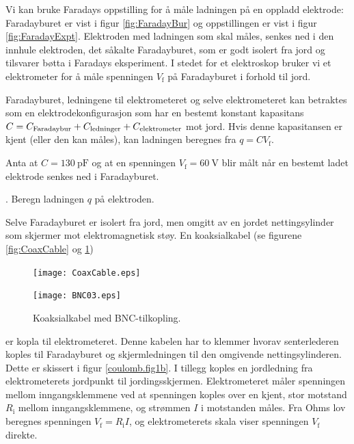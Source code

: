 \documentclass[../Elmag-labhefte-2020.tex]{subfiles}
\begin{document}
Vi kan bruke Faradays oppstilling for å måle ladningen på en oppladd elektrode: Faradayburet er vist i figur \ref{fig:FaradayBur} og oppstillingen er vist i figur \ref{fig:FaradayExpt}.  Elektroden med ladningen som skal måles, senkes ned i den innhule elektroden, det såkalte Faradayburet, som er godt isolert fra jord og tilsvarer bøtta i Faradays eksperiment. I stedet for et elektroskop bruker vi et elektrometer for å måle spenningen $V_\text{f}$ på Faradayburet i forhold til jord.  


Faradayburet, ledningene til elektrometeret og selve elektrometeret kan betraktes som en elektrodekonfigurasjon som har en bestemt konstant kapasitans $C = C_\text{Faradaybur} + C_{\rm ledninger} + C_\text{elektrometer}$ mot jord.  Hvis denne kapasitansen er kjent (eller den kan måles), kan ladningen beregnes fra $q = C V_\text{f}$.

Anta at $C = \SI{130}{\pico\farad}$ og at en spenningen $V_\text{f} = \SI{60}{\volt}$ blir målt når en bestemt ladet elektrode senkes ned i Faradayburet.

{.  Beregn ladningen $q$ på elektroden.}

Selve Faradayburet er isolert fra jord, men omgitt av en jordet nettingsylinder som skjermer mot elektromagnetisk støy. En koaksialkabel (se figurene \ref{fig:CoaxCable} og \ref{fig:BNC03}) 

\begin{figure}[!h]
    \begin{minipage}[b]{0.5\linewidth}
        \centering
        \texttt{[image: CoaxCable.eps]}
        \caption{%
            Tverrsnitt av en koaksialkabel.
        }
        \label{fig:CoaxCable}
    \end{minipage}
    \hspace{0.15cm}
    \begin{minipage}[b]{0.5\linewidth}
        \centering
        \texttt{[image: BNC03.eps]}
        \caption{%
            Koaksialkabel med BNC-tilkopling.
        }
        \label{fig:BNC03}
    \end{minipage}
\end{figure}
er kopla til elektrometeret. Denne kabelen har to klemmer hvorav senterlederen koples til Faradayburet og skjermledningen til den omgivende nettingsylinderen. Dette er skissert i figur \ref{coulomb.fig1b}. I tillegg koples en jordledning fra elektrometerets jordpunkt til jordingsskjermen. Elektrometeret måler spenningen mellom inngangsklemmene ved at spenningen koples over en kjent, stor motstand $R_\text{i}$ mellom inngangsklemmene, og strømmen $I$ i motstanden måles. Fra Ohms lov beregnes spenningen $V_\text{f} = R_\text{i}  I$, og elektrometerets skala viser spenningen $V_\text{f}$ direkte. 
\end{document}
